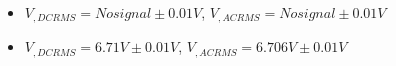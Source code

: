 \begin{itemize}
     \item $V_{, DCRMS}=No signal\pm 0.01\unit{V}$, $V_{, ACRMS}=No signal\pm 0.01\unit{V}$ 
     \item $V_{, DCRMS}=6.71V\pm 0.01\unit{V}$, $V_{, ACRMS}=6.706V\pm 0.01\unit{V}$\\
\end{itemize}